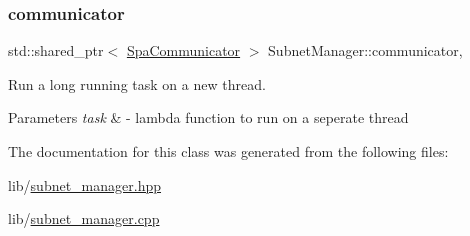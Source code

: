 \subsubsection{\texorpdfstring{communicator}{communicator}}
{\footnotesize\ttfamily std\+::shared\+\_\+ptr$<$ \hyperlink{classSpaCommunicator}{Spa\+Communicator} $>$ Subnet\+Manager\+::communicator\hspace{0.3cm}{\ttfamily [static]}, {\ttfamily [protected]}}



Run a long running task on a new thread. 


\begin{DoxyParams}{Parameters}
{\em task} & -\/ lambda function to run on a seperate thread \\
\hline
\end{DoxyParams}


The documentation for this class was generated from the following files\+:\begin{DoxyCompactItemize}
\item 
lib/\hyperlink{subnet__manager_8hpp}{subnet\+\_\+manager.\+hpp}\item 
lib/\hyperlink{subnet__manager_8cpp}{subnet\+\_\+manager.\+cpp}\end{DoxyCompactItemize}

